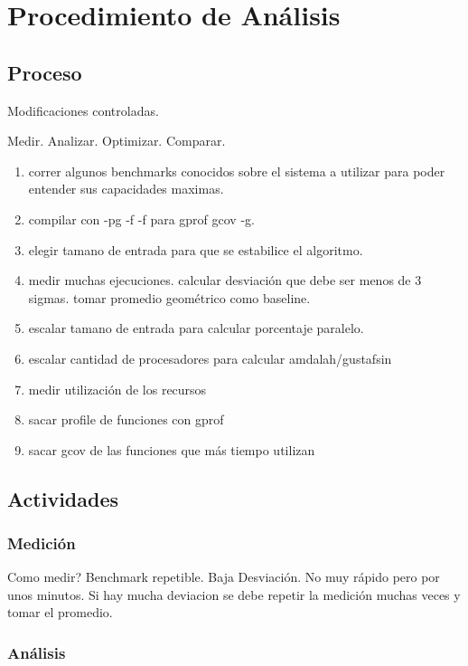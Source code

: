 \documentclass[a4paper]{report}
\begin{document}
\chapter{Procedimiento de An\'alisis}

\section{Proceso}

Modificaciones controladas.


\bigskip

Medir. Analizar. Optimizar. Comparar.

\begin{enumerate}
\item correr algunos benchmarks conocidos sobre el sistema a utilizar para poder entender sus capacidades maximas.
\item compilar con -pg -f -f para gprof gcov -g.
\item elegir tamano de entrada para que se estabilice el algoritmo.
\item medir muchas ejecuciones. calcular desviaci\'on que debe ser menos de 3 sigmas. tomar promedio geom\'etrico como baseline.
\item escalar tamano de entrada para calcular porcentaje paralelo.
\item escalar cantidad de procesadores para calcular amdalah/gustafsin
\item medir utilizaci\'on de los recursos
\item sacar profile de funciones con gprof
\item sacar gcov de las funciones que m\'as tiempo utilizan
\end{enumerate}

\section{Actividades}

\subsection{Medici\'on}

Como medir? Benchmark repetible. Baja Desviaci\'on. No muy r\'apido pero por unos
minutos. Si hay mucha deviacion se debe repetir la medici\'on muchas veces y
tomar el promedio.

\subsection{An\'alisis}
\end{document}
